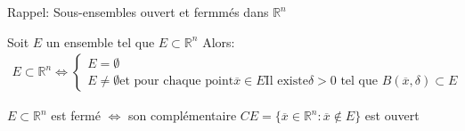 
\begin{parag}{Rappel: Sous-ensembles ouvert et fermmés dans $ \mathbb{R}^n $}
    \begin{definition}
      Soit $E$ un ensemble tel que $E \subset \mathbb{R}^n $ Alors:
      \begin{align*}
          E \subset \mathbb{R}^n  \iff \begin{cases}
              E = \emptyset \\
              E \neq \emptyset \text{et pour chaque point} \overline{x} \in E \text{Il existe} \delta > 0 \text{ tel que } B( \overline{x}, \delta) \subset E
          \end{cases}
      \end{align*}
      
    \end{definition}
    \begin{definition}
        $E \subset \mathbb{R}^n $ est fermé $ \iff$ son complémentaire $CE = \{ \overline{x} \in \mathbb{R}^n : \overline{x} \notin E\}$ est ouvert
    \end{definition}
\end{parag}


